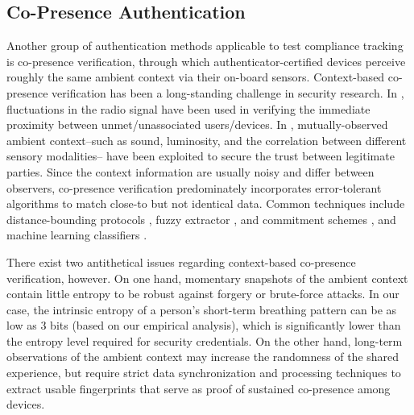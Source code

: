 \subsection{Co-Presence Authentication}
Another group of authentication methods applicable to test compliance tracking is co-presence verification, through which authenticator-certified devices perceive roughly the same ambient context via their on-board sensors. Context-based co-presence verification has been a long-standing challenge in security research. In \cite{ScannellProximitybasedAuthenticationMobile2009, NarayananLocationPrivacyPrivate2011, ZhengLocationBasedHandshake2017}, fluctuations in the radio signal have been used in verifying the immediate proximity between unmet/unassociated users/devices. In \cite{SchurmannSecureCommunicationBased2011, MiettinenContextBasedZeroInteractionPairing2014, HanYouFeelWhat2018, PutzAcousticIntegrityCodes2020}, mutually-observed ambient context--such as sound, luminosity, and the correlation between different sensory modalities-- have been exploited to secure the trust between legitimate parties. Since the context information are usually noisy and differ between observers, co-presence verification predominately incorporates error-tolerant algorithms to match close-to but not identical data. Common techniques include distance-bounding protocols \cite{SingeleeLocationVerificationUsing2005}, fuzzy extractor \cite{NarayananLocationPrivacyPrivate2011, ZhengLocationBasedHandshake2017}, and commitment schemes \cite{MiettinenContextBasedZeroInteractionPairing2014}, and machine learning classifiers \cite{WuLearningDevicePairing2018}. 

There exist two antithetical issues regarding context-based co-presence verification, however. On one hand, momentary snapshots of the ambient context contain little entropy to be robust against forgery or brute-force attacks. In our case, the intrinsic entropy of a person's short-term breathing pattern can be as low as 3 bits (based on our empirical analysis),  which is significantly lower than the entropy level required for security credentials. On the other hand, long-term observations of the ambient context may increase the randomness of the shared experience, but require strict data synchronization and processing techniques to extract usable fingerprints that serve as proof of sustained co-presence among devices.